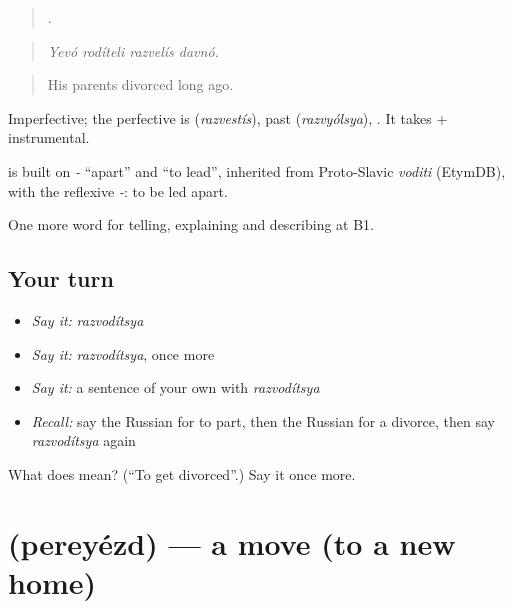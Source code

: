 \begin{quote}
   .
\end{quote}

\begin{quote}
\emph{Yevó rodíteli razvelís davnó.}
\end{quote}

\begin{quote}
His parents divorced long ago.
\end{quote}

Imperfective; the perfective is \emph{} (\emph{razvestís}), past \emph{} (\emph{razvyólsya}), \emph{}. It takes \emph{} + instrumental.

\begin{cousinweb}
\emph{} is built on \emph{-} \textquotedblleft{}apart\textquotedblright{} and \emph{} \textquotedblleft{}to lead\textquotedblright{}, inherited from Proto-Slavic \emph{voditi} (EtymDB), with the reflexive \emph{-}: to be led apart.
\end{cousinweb}

\begin{grammarlens}[title={What you've built}]
One more word for telling, explaining and describing at B1.
\end{grammarlens}

\subsection*{Your turn}
\begin{itemize}
\raggedright
  \item \emph{Say it:} \emph{razvodítsya}
  \item \emph{Say it:} \emph{razvodítsya}, once more
  \item \emph{Say it:} a sentence of your own with \emph{razvodítsya}
  \item \emph{Recall:} say the Russian for to part, then the Russian for a divorce, then say \emph{razvodítsya} again
\end{itemize}

\begin{tcolorbox}[breakable,colback=teal!4,colframe=teal!35!black,title={Before you move on}]
What does  mean? (\textquotedblleft{}To get divorced\textquotedblright{}.) Say it once more.
\end{tcolorbox}
\section[\texorpdfstring{\ru{переезд} (pereyézd)}{переезд (pereyézd)}]{ (pereyézd) — a move (to a new home)}

